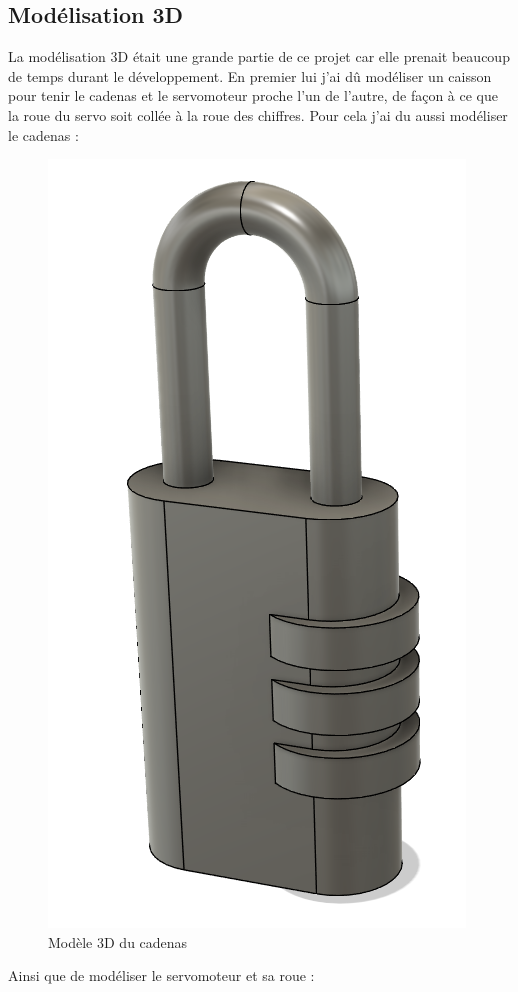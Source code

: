\documentclass[twoside]{article}
\begin{document}
\begin{multicols}{2}
\section{Modélisation 3D}
La modélisation 3D était une grande partie de ce projet car elle prenait beaucoup de temps durant le développement. En premier lui j'ai dû modéliser un caisson pour tenir le cadenas et le servomoteur proche l'un de l'autre, de façon à ce que la roue du servo soit collée à la roue des chiffres. Pour cela j'ai du aussi modéliser le cadenas : 
\begin{figure}[H]
\centering
\includegraphics[scale=0.3]{locker.png}
\caption{Modèle 3D du cadenas}
\end{figure}
Ainsi que de modéliser le servomoteur et sa roue : 


\end{multicols}
\end{document}
